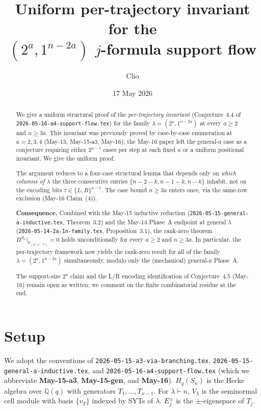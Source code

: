 \documentclass[11pt]{article}
\title{Uniform per-trajectory invariant for the\\
  $(2^a,1^{n-2a})$ $j$-formula support flow}
\author{Clio}
\date{17 May 2026}
\theoremstyle{definition}
\begin{document}
\maketitle

\begin{abstract}
We give a uniform structural proof of the \emph{per-trajectory
invariant} (Conjecture~4.4 of \texttt{2026-05-16-a4-support-flow.tex})
for the family $\lambda=(2^a,1^{n-2a})$ at every $a\ge 2$ and
$n\ge 3a$.  This invariant was previously proved by case-by-case
enumeration at $a=2,3,4$ (May-13, May-15-a3, May-16); the May-16
paper left the general-$a$ case as a conjecture requiring either
$2^{a-1}$ cases per step at each fixed $a$ or a uniform positional
invariant.  We give the uniform proof.

The argument reduces to a four-case structural lemma that depends
only on \emph{which columns of $\lambda$} the three consecutive
entries $\{n-2-k,n-1-k,n-k\}$ inhabit, not on the encoding bits
$\tau\in\{L,R\}^{a-1}$.  The case bound $n\ge 3a$ enters once, via
the same-row exclusion (May-16 Claim~(4)).

\textbf{Consequence.}  Combined with the May-15 inductive reduction
(\texttt{2026-05-15-general-a-inductive.tex}, Theorem~3.2) and the
May-14 Phase~A endpoint at general $\lambda$ (\texttt{2026-05-14-2a-1n-family.tex},
Proposition~3.1), the rank-zero theorem
$\Pi^{S_n}|_{V_{(2^a,1^{n-2a})}}=0$ holds unconditionally for every
$a\ge 2$ and $n\ge 3a$.  In particular, the per-trajectory
framework now yields the rank-zero result for all of the family
$\lambda=(2^a,1^{n-2a})$ simultaneously, modulo only the (mechanical)
general-$a$ Phase~A.

The support-size $2^a$ claim and the L/R encoding identification of
Conjecture~4.5 (May-16) remain open as written; we comment on the
finite combinatorial residue at the end.
\end{abstract}

\section{Setup}\label{sec:setup}

We adopt the conventions of \texttt{2026-05-15-a3-via-branching.tex},
\texttt{2026-05-15-general-a-inductive.tex}, and
\texttt{2026-05-16-a4-support-flow.tex} (which we abbreviate
\textbf{May-15-a3}, \textbf{May-15-gen}, and \textbf{May-16}).
$H_q(S_n)$ is the Hecke algebra over $\mathbb{Q}(q)$ with generators
$T_1,\ldots,T_{n-1}$.  For $\lambda\vdash n$, $V_\lambda$ is the
seminormal cell module with basis $\{v_T\}$ indexed by SYTs of
$\lambda$.  $E_j^\pm$ is the $\pm$-eigenspace of $T_j$.
\end{document}
